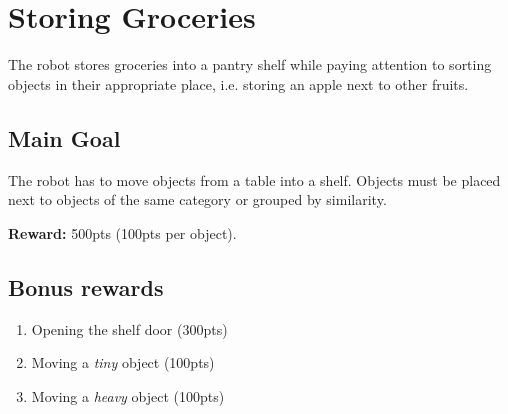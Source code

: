 \section{Storing Groceries}
The robot stores groceries into a pantry shelf while paying attention to sorting objects in their appropriate place, i.e. storing an apple next to other fruits.


\subsection{Main Goal}
The robot has to move objects from a table into a shelf. Objects must be placed next to objects of the same category or grouped by similarity.

\noindent\textbf{Reward:} 500pts (100pts per object).\\


\subsection{Bonus rewards}
\begin{enumerate}[nosep]
	\item Opening the shelf door (300pts)
	\item Moving a \emph{tiny} object (100pts)
	\item Moving a \emph{heavy} object (100pts)
\end{enumerate}

%
%
